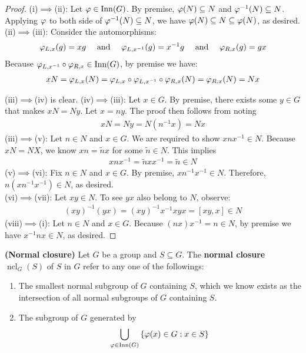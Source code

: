 \documentclass{report}
\begin{document}
\begin{proof}
  (i)$\implies $(ii): Let $\pfi  \in \operatorname{Inn}(G)$. By premise, $\pfi  (N)\subseteq N$ and $\pfi ^{-1}(N)\subseteq N$. Applying  $\pfi $ to both side of $\pfi ^{-1}(N)\subseteq N$, we have $\pfi (N)\subseteq N \subseteq \pfi  (N)$, as desired. \\

(ii)$\implies $(iii): Consider the automorphisms:  
\begin{align*}
 \pfi_{L,x}(g)= xg\quad \text{ and }\quad \pfi _{L,x^{-1}}(g)=x^{-1}g \quad \text{ and }\quad \pfi _{R,x}(g)= gx
\end{align*}
 Because $\pfi _{L,x^{-1}}\circ \pfi _{R,x} \in \operatorname{Inn}(G)$, by premise we have:
\begin{align*}
xN= \pfi _{L,x}(N)= \pfi _{L,x}\circ \pfi _{L,x^{-1}}\circ \pfi _{R,x}(N)= \pfi _{R,x}(N)=Nx 
\end{align*}

(iii)$\implies $(iv) is clear. (iv)$\implies $(iii): Let $x\in G$. By premise, there exists some $y\in G$ that makes $xN=Ny$. Let $x=ny$. The proof then follows from noting 
\begin{align*}
xN=Ny=N(n^{-1}x)=Nx
\end{align*}
(iii)$\implies $(v): Let $n \in N$ and $x \in G$. We are required to show $xnx^{-1} \in N$. Because $xN=NX$, we know  $xn=\tilde{n}x$ for some $\tilde{n}\in N$. This implies 
\begin{align*}
xnx^{-1}= \tilde{n}xx^{-1}=\tilde{n}\in N  
\end{align*}
(v)$\implies $(vi): Fix $n\in N$ and $x\in G$. By premise, $xn^{-1}x^{-1} \in N$. Therefore, $n(xn^{-1}x^{-1})\in N$, as desired.\\


(vi)$\implies $(vii): Let $xy \in N$. To see $yx$ also belong to $N$, observe: 
\begin{align*}
 (xy)^{-1}(yx) =(xy)^{-1}x^{-1}xyx=[xy,x] \in N
\end{align*}
(viii)$\implies $(i): Let $n \in N$ and $x\in G$. Because $(nx)x^{-1}=n \in N$, by premise we have $x^{-1}nx \in N$, as desired.
\end{proof}
\begin{equiv_def}
\textbf{(Normal closure)} Let $G$ be a group and $S\subseteq G$. The \textbf{normal closure} $\operatorname{ncl}_G(S)$ of $S$ in  $G$  refer to any one of the followings: 
\begin{enumerate}[label=(\roman*)]
  \item The smallest normal subgroup of $G$ containing $S$, which we know exists as the intersection of all normal subgroups of $G$ containing $S$.  
  \item The subgroup of $G$ generated by 
\begin{align*}
 \bigcup_{\pfi \in \operatorname{Inn}(G)} \set{\pfi (x) \in G:x \in S} 
\end{align*}   
\end{enumerate}
\end{equiv_def}
\end{document}
